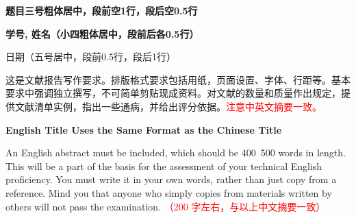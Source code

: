 \documentclass[a4paper,10.5pt,oweside]{article} %
\newcommand{\sanhao}{\fontsize{15.75pt}{\baselineskip}\selectfont}
\newcommand{\xiaosihao}{\fontsize{12pt}{\baselineskip}\selectfont}
\newcommand{\wuhao}{\fontsize{10.5pt}{\baselineskip}\selectfont}
\newcommand{\xiaowuhao}{\fontsize{9pt}{\baselineskip}\selectfont}
\theoremstyle{definition}
\numberwithin{equation}{section} %
\newcommand{\Title}[1]{\vspace{1ex} {\sanhao \bfseries #1}}
\newcommand{\AuthorID}[2]{\vspace{3.5ex} {\xiaosihao \bfseries #2,\: #1}}
\newcommand{\Date}[1]{\vspace{2ex} {\wuhao #1} \vspace{2ex}}
\newcommand{\Abstractcn}[2]{
        \begin{changemargin}{1cm}{1cm}
            {\xiaowuhao{\bfseries{摘\quad 要:\ }} #1 } \\ \vspace{1ex}
            {\xiaowuhao {\bfseries 关键词:} #2 }
        \end{changemargin}}
\newcommand{\Abstracten}[2]{
        \begin{changemargin}{1cm}{1cm}
            {\xiaowuhao{\bfseries{Abstract:}} #1 } \\ \vspace{1ex}
            {\xiaowuhao {\bfseries Key words:} #2 }
        \end{changemargin}}
\begin{document}



    \setcounter{page}{1}
    \leavevmode %
    \begin{center}
        \vspace{1ex}

        \Title{题目三号粗体居中，段前空1行，段后空0.5行}

        \AuthorID{姓名（小四粗体居中，段前后各0.5行）}{学号}

        \Date{日期（五号居中，段前0.5行，段后1行） }

        \Abstractcn{这是文献报告写作要求。排版格式要求包括用纸，页面设置、字体、行距等。基本要求中强调独立撰写，不可简单剪贴现成资料。对文献的数量和质量作出规定，提供文献清单实例，指出一些通病，并给出评分依据。\textcolor{red}{注意中英文摘要一致。}}{}

        \vspace{3ex}

        \Title{English Title Uses the Same Format as the Chinese Title}

        \Abstracten{An English abstract must be included, which should be 400~500 words in length. This will be a part of the basis for the assessment of your technical English proficiency. You must write it in your own words, rather than just copy from a reference. Mind you that anyone who simply copies from materials written by others will not pass the examination. \textcolor{red}{（200 字左右，与以上中文摘要一致）}}{}

    \end{center}
    \vspace{2ex}




    







    \titleformat{\section}{}{\thesection}{1em}{} %
\end{document}
